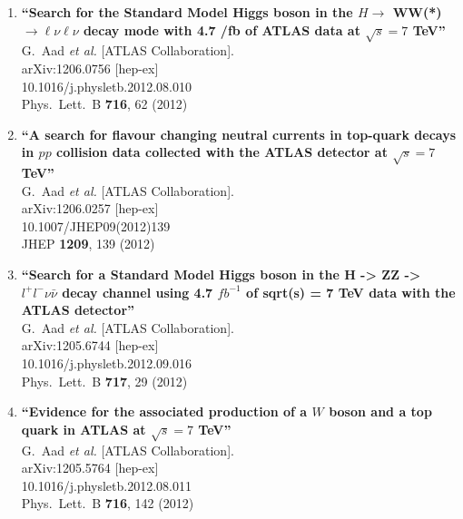 \documentclass{article}
\begin{document}
\begin{enumerate}
\item%
{\bf ``Search for the Standard Model Higgs boson in the $H \to$ WW(*) $\to \ell \nu \ell \nu$ decay mode with 4.7 /fb of ATLAS data at $\sqrt{s}=7$ TeV''}
  \\{}G.~Aad {\it et al.}  [ATLAS Collaboration].
  \\{}arXiv:1206.0756 [hep-ex]
    \\{}10.1016/j.physletb.2012.08.010
\\{}Phys.\ Lett.\ B {\bf 716}, 62 (2012) %


\item%
{\bf ``A search for flavour changing neutral currents in top-quark decays in $pp$ collision data collected with the ATLAS detector at $\sqrt{s}=7$ TeV''}
  \\{}G.~Aad {\it et al.}  [ATLAS Collaboration].
  \\{}arXiv:1206.0257 [hep-ex]
    \\{}10.1007/JHEP09(2012)139
\\{}JHEP {\bf 1209}, 139 (2012) %


\item%
{\bf ``Search for a Standard Model Higgs boson in the H -> ZZ -> $l^+l^-\nu \bar{\nu}$ decay channel using 4.7 $fb^{-1}$ of sqrt(s) = 7 TeV data with the ATLAS detector''}
  \\{}G.~Aad {\it et al.}  [ATLAS Collaboration].
  \\{}arXiv:1205.6744 [hep-ex]
    \\{}10.1016/j.physletb.2012.09.016
\\{}Phys.\ Lett.\ B {\bf 717}, 29 (2012) %


\item%
{\bf ``Evidence for the associated production of a $W$ boson and a top quark in ATLAS at $\sqrt{s}=7$ TeV''}
  \\{}G.~Aad {\it et al.}  [ATLAS Collaboration].
  \\{}arXiv:1205.5764 [hep-ex]
    \\{}10.1016/j.physletb.2012.08.011
\\{}Phys.\ Lett.\ B {\bf 716}, 142 (2012) %



\end{enumerate}
\end{document}
